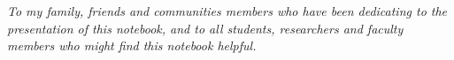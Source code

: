 \cleardoublepage
\thispagestyle{empty}
\begin{center}
\Large\itshape
To my family, friends and communities members who have been dedicating to the presentation of this notebook, and to all students, researchers and faculty members who might find this notebook helpful.
\end{center}
